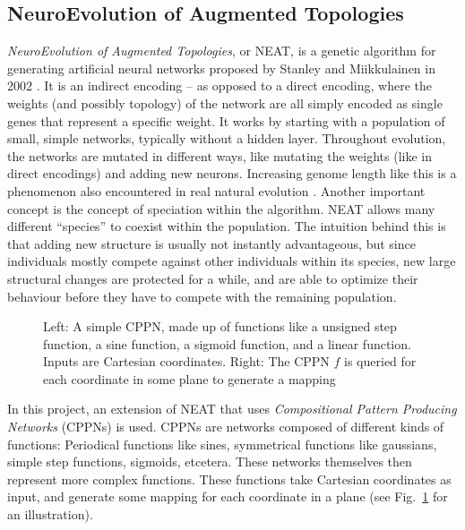 \documentclass[a4paper]{article}
\numberwithin{equation}{section}
\begin{document}
\subsection{NeuroEvolution of Augmented Topologies}
\emph{NeuroEvolution of Augmented Topologies}, or NEAT, is a genetic algorithm
for generating artificial neural networks proposed by Stanley and Miikkulainen
in 2002 \cite{stanley2002evolving}. It is an indirect encoding -- as opposed to
a direct encoding, where the weights (and possibly topology) of the network are
all simply encoded as single genes that represent a specific weight. It works
by starting with a population of small, simple networks, typically without a
hidden layer. Throughout evolution, the networks are mutated in different ways,
like mutating the weights (like in direct encodings) and adding new neurons.
Increasing genome length like this is a phenomenon also encountered in real
natural evolution \cite{martin1999increasing}. Another important concept is the
concept of speciation within the algorithm. NEAT allows many different
``species'' to coexist within the population. The intuition behind this is that
adding new structure is usually not instantly advantageous, but since
individuals mostly compete against other individuals within its species, new
large structural changes are protected for a while, and are able to optimize
their behaviour before they have to compete with the remaining population.

\begin{figure}[ht]
    \centering
    
    \caption{Left: A simple CPPN, made up of functions like a unsigned step
    function, a sine function, a sigmoid function, and a linear function. Inputs
    are Cartesian coordinates. Right: The CPPN $f$ is queried for each
    coordinate in some plane to generate a mapping}
    \label{fig:cppn}
\end{figure}

In this project, an extension of NEAT that uses \emph{Compositional Pattern
Producing Networks} (CPPNs) is used. CPPNs are networks composed of different
kinds of functions: Periodical functions like sines, symmetrical functions like
gaussians, simple step functions, sigmoids, etcetera. These networks themselves
then represent more complex functions. These functions take Cartesian
coordinates as input, and generate some mapping for each coordinate in a plane
(see Fig.~\ref{fig:cppn} for an illustration).
\end{document}
